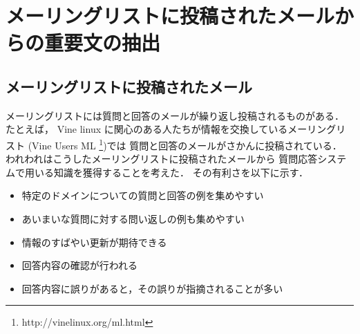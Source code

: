  \section{メーリングリストに投稿されたメールからの重要文の抽出}
 \label{sec:メーリングリストに投稿されたメールからの重要文の抽出}

  \subsection{メーリングリストに投稿されたメール}
 
 メーリングリストには質問と回答のメールが繰り返し投稿されるものがある．
 たとえば，
 Vine linux に関心のある人たちが情報を交換しているメーリングリスト
 (Vine Users ML \footnote{http://vinelinux.org/ml.html})では
 質問と回答のメールがさかんに投稿されている．
 われわれはこうしたメーリングリストに投稿されたメールから
 質問応答システムで用いる知識を獲得することを考えた．
 その有利さを以下に示す．
 \begin{itemize}
  \item 特定のドメインについての質問と回答の例を集めやすい
  \item あいまいな質問に対する問い返しの例も集めやすい
  \item 情報のすばやい更新が期待できる
  \item 回答内容の確認が行われる
  \item 回答内容に誤りがあると，その誤りが指摘されることが多い
 \end{itemize}

